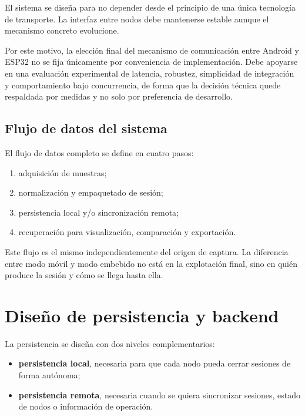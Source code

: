 El sistema se diseña para no depender desde el principio de una única tecnología de transporte. La interfaz entre nodos debe mantenerse estable aunque el mecanismo concreto evolucione.

Por este motivo, la elección final del mecanismo de comunicación entre Android y ESP32 no se fija únicamente por conveniencia de implementación. Debe apoyarse en una evaluación experimental de latencia, robustez, simplicidad de integración y comportamiento bajo concurrencia, de forma que la decisión técnica quede respaldada por medidas y no solo por preferencia de desarrollo.

\subsection{Flujo de datos del sistema}

El flujo de datos completo se define en cuatro pasos:

\begin{enumerate}
  \item adquisición de muestras;
  \item normalización y empaquetado de sesión;
  \item persistencia local y/o sincronización remota;
  \item recuperación para visualización, comparación y exportación.
\end{enumerate}

\label{fig:placeholder-flujo-datos}

Este flujo es el mismo independientemente del origen de captura. La diferencia entre modo móvil y modo embebido no está en la explotación final, sino en quién produce la sesión y cómo se llega hasta ella.

\section{Diseño de persistencia y backend}

La persistencia se diseña con dos niveles complementarios:

\begin{itemize}
  \item \textbf{persistencia local}, necesaria para que cada nodo pueda cerrar sesiones de forma autónoma;
  \item \textbf{persistencia remota}, necesaria cuando se quiera sincronizar sesiones, estado de nodos o información de operación.
\end{itemize}

